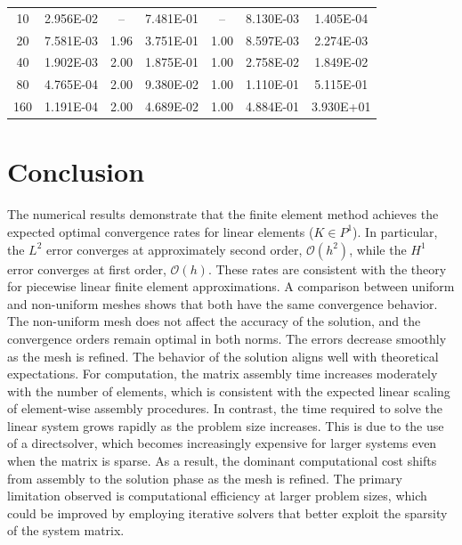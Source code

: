 \documentclass[11pt]{article}      %
\begin{document}
\begin{enumerate}
\begin{table}[!h]
\begin{tabular}{|c|c|c|c|c|c|c|}
		\hline
		10   & 2.956E-02 & --    & 7.481E-01 & --    & 8.130E-03 & 1.405E-04 \\
		20   & 7.581E-03 & 1.96  & 3.751E-01 & 1.00  & 8.597E-03 & 2.274E-03 \\
		40   & 1.902E-03 & 2.00  & 1.875E-01 & 1.00  & 2.758E-02 & 1.849E-02 \\
		80   & 4.765E-04 & 2.00  & 9.380E-02 & 1.00  & 1.110E-01 & 5.115E-01 \\
		160  & 1.191E-04 & 2.00  & 4.689E-02 & 1.00  & 4.884E-01 & 3.930E+01 \\
		\hline
	\end{tabular}
	\label{tab_nonuniform_mesh}
\end{table}
\clearpage
\section{Conclusion}
The numerical results demonstrate that the finite element method achieves the expected optimal convergence rates for linear elements ($K \in P^1$). 
In particular, the $L^2$ error converges at approximately second order, $\mathcal{O}(h^2)$, while the $H^1$ error converges at first order, $\mathcal{O}(h)$. 
These rates are consistent with the theory for piecewise linear finite element approximations. 
A comparison between uniform and non-uniform meshes shows that both have the same convergence behavior. The non-uniform mesh does not affect the accuracy of the solution, 
and the convergence orders remain optimal in both norms.
The errors decrease smoothly as the mesh is refined. The behavior of the solution aligns well with theoretical expectations. 
For computation, the matrix assembly time increases moderately with the number of elements,
which is consistent with the expected linear scaling of element-wise assembly procedures. In contrast, the time required to solve the linear system grows rapidly as the problem size increases. This is due to the use of a directsolver, which becomes increasingly expensive for larger systems even when the matrix is sparse. As a result, the dominant computational cost shifts from assembly to the solution phase as the mesh is refined.
The primary limitation observed is computational efficiency at larger problem sizes, which could be improved by employing iterative solvers that better exploit the sparsity of the system matrix.
\end{enumerate}


\end{document}
